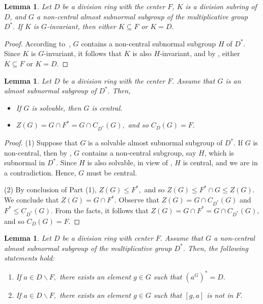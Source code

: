 \documentclass{amsart}
\newtheorem{lemma}[theorem]{Lemma}
\theoremstyle{definition}
\begin{document}
\begin{lemma}\label{lem:3.8} Let $D$ be a division ring with the center $F$, $K$ is a division subring of $D$, and $G$ a non-central almost subnormal subgroup of the multiplicative group $D^*.$ If  $K$ is $G$-invariant, then either $K\subseteq F$ or $K=D.$
\end{lemma}
\begin{proof} According to~\cite[Theorem 2.1]{Pa_ChNaHa_24}, $G$ contains a non-central subnormal subgroup $H$ of $D^*$. Since $K$ is $G$-invariant, it follows that $K$ is also $H$-invariant, and by \cite[Theorem 1]{Pa_Stuth_1964}, either $K\subseteq F$ or $K=D.$
\end{proof}
\begin{lemma}\label{lem:3.9} Let $D$ be a division ring with the center $F.$ Assume that $G$ is an almost subnormal subgroup of $D^*.$ Then,
	\begin{itemize}
		\item [(1)] If $G$ is solvable, then $G$ is central.
		\item [(2)] $Z(G)=G\cap F^*=G\cap C_{D^*}(G),$ and so $C_{D}(G)=F.$
	\end{itemize}	
\end{lemma}
\begin{proof} (1) Suppose that $G$ is a solvable almost subnormal subgroup of $D^*$. If $G$ is non-central, then by \cite[Theorem 2.1]{Pa_ChNaHa_24}, $G$ contains a non-central  subgroup, say $H$, which is subnormal in $D^*$. Since $H$ is also solvable, in view of \cite[Theorem 4]{Pa_Stuth_1964}, $H$ is central, and we are in a contradiction. Hence, $G$ must be central.
	
	(2) By conclusion of Part (1), $Z(G)\le F^*,$ and so $Z(G)\leq F^*\cap G\leq Z(G).$ We conclude that $Z(G)=G\cap F^*.$ Observe that $Z(G)=G\cap C_{D^*}(G)$ and $F^*\leq C_{D^*}(G).$ From the facts, it follows that $Z(G)=G\cap F^*=G\cap C_{D^*}(G),$ and so $C_{D}(G)=F.$
\end{proof}
\begin{lemma}\label{lem:3.10} Let $D$ be a division ring with center $F.$ Assume that $G$ a non-central almost subnormal subgroup of the multiplicative group $D^*$. Then, the following statements hold:
	\begin{enumerate}
		\rm\item\textit{If $a\in D\backslash F,$ there exists an element $g\in G$ such that $(a^G)^*=D.$} 
		\rm\item\textit{If $a\in D\backslash F,$ there exists an element $g\in G$ such that $[g,a]$ is not in $F.$}
	\end{enumerate}
\end{lemma}
\end{document}
